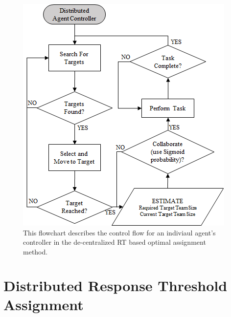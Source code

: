\documentclass[defaultstyle,12pt]{thesis}
\begin{document}
\begin{figure}[!ht]
\centering\includegraphics[width=.5\columnwidth]{../assets/DistributedController.png}
\centering\caption{This flowchart describes the control flow for an indiviaul agent's controller in the de-centralized RT based optimal assignment method.}\label{fig:distcontrol}
\end{figure}

\section{Distributed Response Threshold Assignment}
\end{document}
